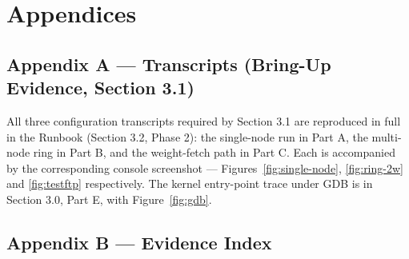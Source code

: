 \documentclass[11pt]{article}
\renewcommand{\_}{\origunderscore\allowbreak}
\begin{document}
\section*{Appendices}

\subsection*{Appendix A --- Transcripts (Bring-Up Evidence, Section 3.1)}

All three configuration transcripts required by Section 3.1 are reproduced in full in the Runbook (Section 3.2, Phase 2): the single-node run in Part A, the multi-node ring in Part B, and the weight-fetch path in Part C. Each is accompanied by the corresponding console screenshot --- Figures~\ref{fig:single-node}, \ref{fig:ring-2w} and \ref{fig:testftp} respectively. The kernel entry-point trace under GDB is in Section 3.0, Part E, with Figure~\ref{fig:gdb}.

\subsection*{Appendix B --- Evidence Index}
\end{document}
